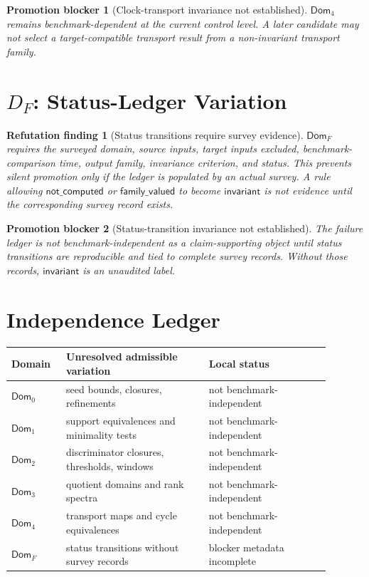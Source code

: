 \documentclass[11pt]{article}
\newcommand{\Dom}{\mathsf{Dom}}
\newtheorem{finding}{Refutation finding}
\newtheorem{blocker}{Promotion blocker}
\begin{document}
\begin{blocker}[Clock-transport invariance not established]
\(\Dom_4\) remains benchmark-dependent at the current control level. A later
candidate may not select a target-compatible transport result from a
non-invariant transport family.
\end{blocker}

\section{\texorpdfstring{\(D_F\)}{DF}: Status-Ledger Variation}

\begin{finding}[Status transitions require survey evidence]
\(\Dom_F\) requires the surveyed domain, source inputs, target inputs
excluded, benchmark-comparison time, output family, invariance criterion, and
status. This prevents silent promotion only if the ledger is populated by an
actual survey. A rule allowing \(\mathsf{not\_computed}\) or
\(\mathsf{family\_valued}\) to become \(\mathsf{invariant}\) is not evidence
until the corresponding survey record exists.
\end{finding}

\begin{blocker}[Status-transition invariance not established]
The failure ledger is not benchmark-independent as a claim-supporting object
until status transitions are reproducible and tied to complete survey
records. Without those records, \(\mathsf{invariant}\) is an unaudited label.
\end{blocker}

\section{Independence Ledger}

\begin{center}
\begin{tabular}{p{0.15\linewidth}p{0.40\linewidth}p{0.34\linewidth}}
\textbf{Domain} & \textbf{Unresolved admissible variation} & \textbf{Local status} \\
\hline
\(\Dom_0\) & seed bounds, closures, refinements & not benchmark-independent \\
\(\Dom_1\) & support equivalences and minimality tests & not benchmark-independent \\
\(\Dom_2\) & discriminator closures, thresholds, windows & not benchmark-independent \\
\(\Dom_3\) & quotient domains and rank spectra & not benchmark-independent \\
\(\Dom_4\) & transport maps and cycle equivalences & not benchmark-independent \\
\(\Dom_F\) & status transitions without survey records & blocker metadata incomplete \\
\end{tabular}
\end{center}
\end{document}
